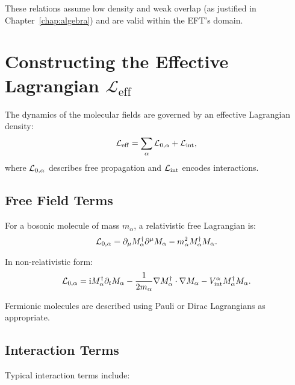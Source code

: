 These relations assume low density and weak overlap (as justified in Chapter~\ref{chap:algebra}) and are valid within the EFT's domain.

\section{Constructing the Effective Lagrangian \texorpdfstring{\(\mathcal{L}_{\mathrm{eff}}\)}{Leff}}
\label{sec:eft_lagrangian}

The dynamics of the molecular fields are governed by an effective Lagrangian density:
\[
\mathcal{L}_{\mathrm{eff}} = \sum_\alpha \mathcal{L}_{0,\alpha} + \mathcal{L}_{\mathrm{int}},
\]
where \(\mathcal{L}_{0,\alpha}\) describes free propagation and \(\mathcal{L}_{\mathrm{int}}\) encodes interactions.

\subsection{Free Field Terms}

For a bosonic molecule of mass \(m_\alpha\), a relativistic free Lagrangian is:
\begin{equation}
	\mathcal{L}_{0,\alpha} = \partial_\mu M^\dagger_\alpha \partial^\mu M_\alpha - m_\alpha^2 M^\dagger_\alpha M_\alpha. \label{eq:lag_free_scalar}
\end{equation}

In non-relativistic form:
\begin{equation}
	\mathcal{L}_{0,\alpha} = \mathrm{i} M^\dagger_\alpha \partial_t M_\alpha - \frac{1}{2m_\alpha} \nabla M^\dagger_\alpha \cdot \nabla M_\alpha - V_{\text{int}}^\alpha M^\dagger_\alpha M_\alpha.
\end{equation}

Fermionic molecules are described using Pauli or Dirac Lagrangians as appropriate.

\subsection{Interaction Terms}

Typical interaction terms include:


